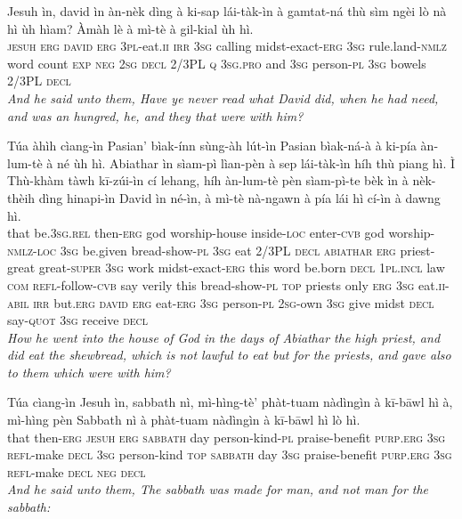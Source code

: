 \documentclass[11pt,a4paper]{article}
\begin{document}
\begin{exe}
\gll Jesuh ìn, david ìn àn-nèk dìng à ki-sap lái-tàk-ìn à gamtat-ná thù sìm ngèi lò nà hì ùh hìam? Àmàh lè à mì-tè à gil-kial ùh hì. \\
     \textsc{jesuh} \textsc{erg} \textsc{david} \textsc{erg} \textsc{3pl}-eat.\textsc{ii} \textsc{irr} \textsc{3sg} calling midst-exact-\textsc{erg} \textsc{3sg} rule.land-\textsc{nmlz} word count \textsc{exp} \textsc{neg} \textsc{2sg} \textsc{decl} 2/3PL \textsc{q} \textsc{3sg}.\textsc{pro} and \textsc{3sg} person-\textsc{pl} \textsc{3sg} bowels 2/3PL \textsc{decl} \\
\glt \textcolor{kjvcolor}{\textit{And he said unto them, Have ye never read what David did, when he had need, and was an hungred, he, and they that were with him?}}

\gll Túa àhìh cìang-ìn Pasian' bìak-ínn sùng-àh lút-ìn Pasian bìak-ná-à à ki-pía àn-lum-tè à né ùh hì. Abiathar ìn sìam-pì lìan-pèn à sep lái-tàk-ìn híh thù piang hì. Ì Thù-khàm tàwh kī-zúi-ìn cí lehang, híh àn-lum-tè pèn sìam-pì-te bèk ìn à nèk-thèih dìng hinapi-ìn David ìn né-ìn, à mì-tè nà-ngawn à pía lái hì cí-ìn à dawng hì. \\
     that be.\textsc{3sg}.\textsc{rel} then-\textsc{erg} god worship-house inside-\textsc{loc} enter-\textsc{cvb} god worship-\textsc{nmlz}-\textsc{loc} \textsc{3sg} be.given bread-show-\textsc{pl} \textsc{3sg} eat 2/3PL \textsc{decl} \textsc{abiathar} \textsc{erg} priest-great great-\textsc{super} \textsc{3sg} work midst-exact-\textsc{erg} this word be.born \textsc{decl} \textsc{1pl}.\textsc{incl} law \textsc{com} \textsc{refl}-follow-\textsc{cvb} say verily this bread-show-\textsc{pl} \textsc{top} priests only \textsc{erg} \textsc{3sg} eat.\textsc{ii}-\textsc{abil} \textsc{irr} but.\textsc{erg} \textsc{david} \textsc{erg} eat-\textsc{erg} \textsc{3sg} person-\textsc{pl} \textsc{2sg}-own \textsc{3sg} give midst \textsc{decl} say-\textsc{quot} \textsc{3sg} receive \textsc{decl} \\
\glt \textcolor{kjvcolor}{\textit{How he went into the house of God in the days of Abiathar the high priest, and did eat the shewbread, which is not lawful to eat but for the priests, and gave also to them which were with him?}}

\gll Túa cìang-ìn Jesuh ìn, sabbath nì, mì-hìng-tè' phàt-tuam nàdìngìn à kī-bāwl hì à, mì-hìng pèn Sabbath nì à phàt-tuam nàdìngìn à kī-bāwl hì lò hì. \\
     that then-\textsc{erg} \textsc{jesuh} \textsc{erg} \textsc{sabbath} day person-kind-\textsc{pl} praise-benefit \textsc{purp}.\textsc{erg} \textsc{3sg} \textsc{refl}-make \textsc{decl} \textsc{3sg} person-kind \textsc{top} \textsc{sabbath} day \textsc{3sg} praise-benefit \textsc{purp}.\textsc{erg} \textsc{3sg} \textsc{refl}-make \textsc{decl} \textsc{neg} \textsc{decl} \\
\glt \textcolor{kjvcolor}{\textit{And he said unto them, The sabbath was made for man, and not man for the sabbath:}}


\end{exe}
\end{document}
